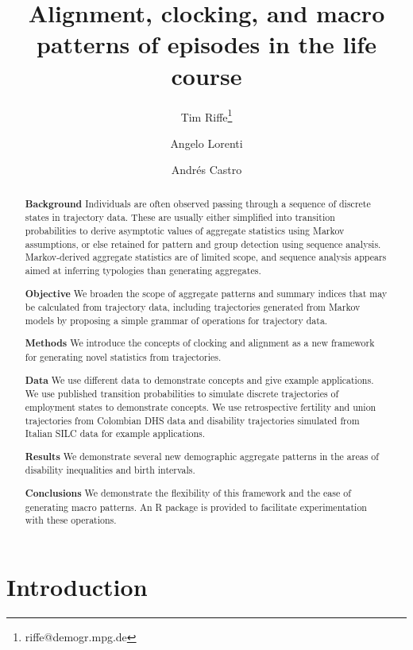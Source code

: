 \documentclass{article}
\newcommand{\absdiv}[1]{%
  \par\addvspace{.5\baselineskip}%
  \noindent\textbf{#1}\quad\ignorespaces
}
\begin{document}
\title{Alignment, clocking, and macro patterns of episodes in the life course}
\author[1]{Tim Riffe\thanks{riffe@demogr.mpg.de}}
\author[1]{Angelo Lorenti}
\author[1]{Andr\'{e}s Castro}
\maketitle

\begin{abstract}

\absdiv{Background}Individuals are often observed passing through a sequence of discrete states in trajectory data. These are usually either simplified into transition probabilities to derive asymptotic values of aggregate statistics using Markov assumptions, or else retained for pattern and group detection using sequence analysis. Markov-derived aggregate statistics are of limited scope, and sequence analysis appears aimed at inferring typologies than generating aggregates.
\absdiv{Objective}We broaden the scope of aggregate patterns and summary indices that may be calculated from trajectory data, including trajectories generated from Markov models by proposing a simple grammar of operations for trajectory data.
\absdiv{Methods}We introduce the concepts of clocking and alignment as a new framework for generating novel statistics from trajectories. 
\absdiv{Data}We use different data to demonstrate concepts and give example applications. We use published transition probabilities to simulate discrete trajectories of employment states to demonstrate concepts. We  use retrospective fertility and union trajectories from Colombian DHS data and disability trajectories simulated from Italian SILC data for example applications.
\absdiv{Results}We demonstrate  several new demographic aggregate patterns in the areas of disability inequalities and birth intervals.
\absdiv{Conclusions}We demonstrate the flexibility of this framework and the ease of generating macro patterns. An R package is provided to facilitate experimentation with these operations.
\end{abstract}

\section{Introduction}
\end{document}
